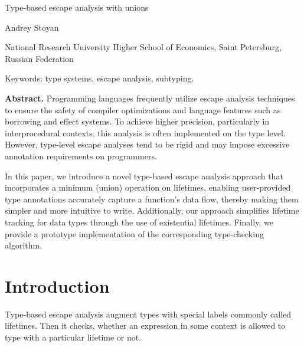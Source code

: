 \documentclass[11pt]{article}
\begin{document}
    \begin{center}
        \LARGE
        Type-based escape analysis with unions

        \small
        Andrey Stoyan

        National Research University Higher School of Economics, Saint Petersburg, Russian Federation

        Keywords: type systems, escape analysis, subtyping.
    \end{center}

    \textbf{Abstract.}
    Programming languages frequently utilize escape analysis techniques to ensure the safety of compiler optimizations and language features such as borrowing and effect systems.
    To achieve higher precision, particularly in interprocedural contexts, this analysis is often implemented on the type level.
    However, type-level escape analyses tend to be rigid and may impose excessive annotation requirements on programmers.

    In this paper, we introduce a novel type-based escape analysis approach that incorporates a minimum (union) operation on lifetimes, enabling user-provided type annotations accurately capture a function’s data flow, thereby making them simpler and more intuitive to write.
    Additionally, our approach simplifies lifetime tracking for data types through the use of existential lifetimes.
    Finally, we provide a prototype implementation of the corresponding type-checking algorithm.


    \section{Introduction}

    Type-based escape analysis augment types with special labels commonly called lifetimes.
    Then it checks, whether an expression in some context is allowed to type with a particular lifetime or not.


\end{document}
